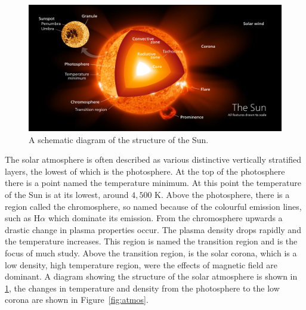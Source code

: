 \begin{figure}[h]
\centering
\includegraphics[width=0.9\linewidth]{Chapter1/Figs/Sun_poster}
\caption{A schematic diagram of the structure of the Sun. \citep{kelvinsong2015}}
\label{fig:sun_poster}
\end{figure}


The solar atmosphere is often described as various distinctive vertically stratified layers, the lowest of which is the photosphere.
At the top of the photosphere there is a point named the temperature minimum.
At this point the temperature of the Sun is at its lowest, around $4,500$ K.
Above the photosphere, there is a region called the chromosphere, so named because of the colourful emission lines, such as H$\alpha$ which dominate its emission.
From the chromosphere upwards a drastic change in plasma properties occur.
The plasma density drops rapidly and the temperature increases.
This region is named the transition region and is the focus of much study.
Above the transition region, is the solar corona, which is a low density, high temperature region, were the effects of magnetic field are dominant.
A diagram showing the structure of the solar atmosphere is shown in \cref{fig:sun_poster}, the changes in temperature and density from the photosphere to the low corona are shown in Figure~\ref{fig:atmos}.

